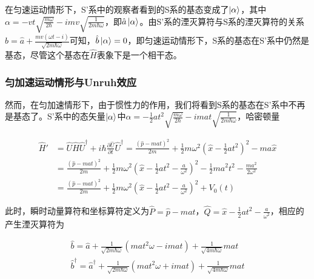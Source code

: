 \documentclass[a4paper]{article}
\begin{document}
            在匀速运动情形下，S'系中的观察者看到的S系的基态变成了$\ket{\alpha}$，其中$\alpha=-vt\sqrt{\frac{m\omega}{2\hbar}}-imv\sqrt{\frac{1}{2m\hbar\omega}}$，即$\hat{a}\ket{\alpha}$。由S'系的湮灭算符与S系的湮灭算符的关系$\hat{b}=\hat{a}+\frac{mv(\omega t-i)}{\sqrt{2m\hbar\omega}}$可知，$\hat{b}\ket{\alpha}=0$，即匀速运动情形下，S系的基态在S'系中仍然是基态，尽管这个基态在$\hat{H}$表象下是一个相干态。


        \subsubsection{匀加速运动情形与Unruh效应}

            然而，在匀加速情形下，由于惯性力的作用，我们将看到S系的基态在S'系中不再是基态了。S'系中的态矢量$\ket{\alpha}$中$\alpha=-\frac{1}{2}at^2\sqrt{\frac{m\omega}{2\hbar}}-imat\sqrt{\frac{1}{2m\hbar\omega}}$，哈密顿量
            
            \begin{equation}
                \begin{split}
                    \hat{H}' &= \hat{U}\hat{H}\hat{U}^\dagger+i\hbar\frac{\partial\hat{U}}{\partial t}\hat{U}^\dagger = \frac{(\hat{p}-mat)^2}{2m}+\frac{1}{2}m\omega^2(\hat{x}-\frac{1}{2}at^2)^2-ma\hat{x} \\
                        &= \frac{(\hat{p}-mat)^2}{2m}+\frac{1}{2}m\omega^2(\hat{x}-\frac{1}{2}at^2-\frac{a}{\omega^2})^2-\frac{1}{2}ma^2t^2-\frac{ma^2}{2\omega^2}　\\
                        &= \frac{(\hat{p}-mat)^2}{2m}+\frac{1}{2}m\omega^2(\hat{x}-\frac{1}{2}at^2-\frac{a}{\omega^2})^2+V_0(t)
                \end{split}
            \end{equation}
                
            此时，瞬时动量算符和坐标算符定义为$\hat{P}=\hat{p}-mat$，$\hat{Q}=\hat{x}-\frac{1}{2}at^2-\frac{a}{\omega^2}$，相应的产生湮灭算符为

            \begin{equation}
                \begin{array}{lr}
                    \hat{b}=\hat{a}+\frac{1}{\sqrt{2m\hbar\omega}}(mat^2\omega-imat)+\frac{1}{\sqrt{4m\hbar\omega}}mat \\
                    \hat{b}^\dagger=\hat{a}^\dagger+\frac{1}{\sqrt{2m\hbar\omega}}(mat^2\omega+imat)+\frac{1}{\sqrt{4m\hbar\omega}}mat
                \end{array}
            \end{equation}
\end{document}
